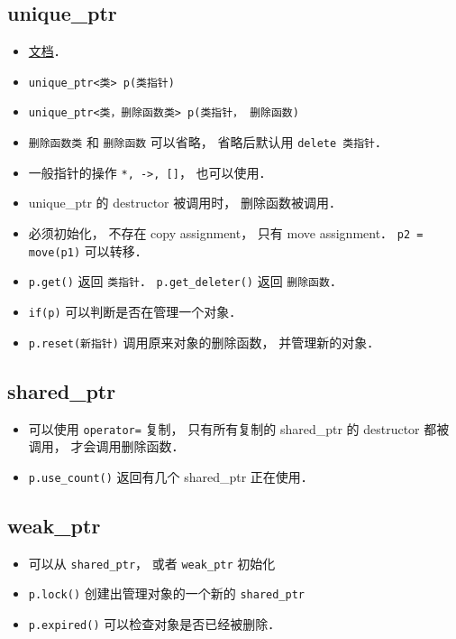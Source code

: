 
\begin{issues}
\issueDraft
\end{issues}

\subsection{unique_ptr}
\begin{itemize}
\item \href{https://en.cppreference.com/w/cpp/memory/unique_ptr}{文档}．
\item \verb|unique_ptr<类> p(类指针)|
\item \verb|unique_ptr<类，删除函数类> p(类指针， 删除函数)|
\item \verb|删除函数类| 和 \verb|删除函数| 可以省略， 省略后默认用 \verb|delete 类指针|．
\item 一般指针的操作 \verb|*, ->, []|， 也可以使用．
\item unique_ptr 的 destructor 被调用时， 删除函数被调用．
\item 必须初始化， 不存在 copy assignment， 只有 move assignment． \verb|p2 = move(p1)| 可以转移．
\item \verb|p.get()| 返回 \verb|类指针|． \verb|p.get_deleter()| 返回 \verb|删除函数|．
\item \verb|if(p)| 可以判断是否在管理一个对象．
\item \verb|p.reset(新指针)| 调用原来对象的删除函数， 并管理新的对象．
\end{itemize}

\subsection{shared_ptr}
\begin{itemize}
\item 可以使用 \verb|operator=| 复制， 只有所有复制的 shared_ptr 的 destructor 都被调用， 才会调用删除函数．
\item \verb|p.use_count()| 返回有几个 shared_ptr 正在使用．
\end{itemize}

\subsection{weak_ptr}
\begin{itemize}
\item 可以从 \verb|shared_ptr|， 或者 \verb|weak_ptr| 初始化
\item \verb|p.lock()| 创建出管理对象的一个新的 \verb|shared_ptr|
\item \verb|p.expired()| 可以检查对象是否已经被删除．
\end{itemize}
